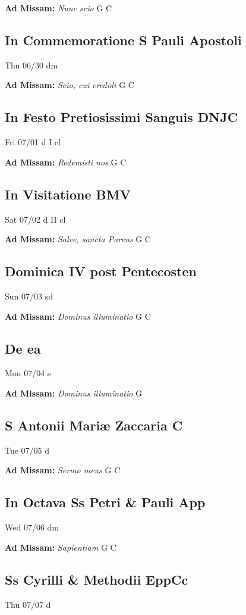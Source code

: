 \documentclass[letterpaper, 10pt, twocolumn]{article}
\begin{document}
\textbf{Ad Missam:} \textit{Nunc scio} G C 

\subsection*{In Commemoratione S Pauli Apostoli}Thu 06/30 dm

\textbf{Ad Missam:} \textit{Scio, cui credidi} G C 

\subsection*{In Festo Pretiosissimi Sanguis DNJC}Fri 07/01 d I cl

\textbf{Ad Missam:} \textit{Redemisti nos} G C 

\subsection*{In Visitatione BMV}Sat 07/02 d II cl

\textbf{Ad Missam:} \textit{Salve, sancta Parens} G C 

\subsection*{Dominica IV post Pentecosten}Sun 07/03 sd

\textbf{Ad Missam:} \textit{Dominus illuminatio} G C 

\subsection*{De ea}Mon 07/04 s

\textbf{Ad Missam:} \textit{Dominus illuminatio} G 

\subsection*{S Antonii Mariæ Zaccaria C}Tue 07/05 d

\textbf{Ad Missam:} \textit{Sermo meus} G C 

\subsection*{In Octava Ss Petri \& Pauli App}Wed 07/06 dm

\textbf{Ad Missam:} \textit{Sapientiam} G C 

\subsection*{Ss Cyrilli \& Methodii EppCc}Thu 07/07 d
\end{document}

